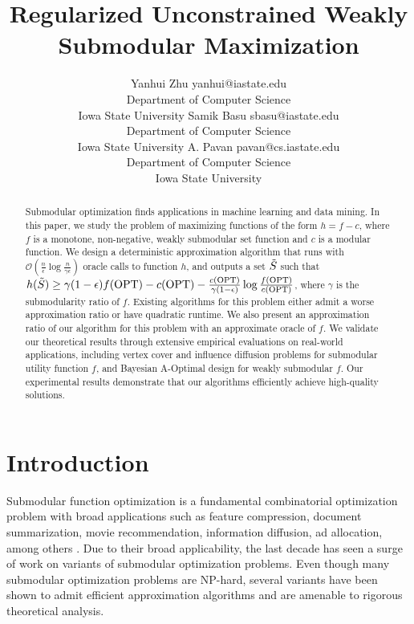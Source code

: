 \documentclass[10pt]{article} %
\title{Regularized Unconstrained Weakly Submodular Maximization}
\author{\name Yanhui Zhu \email yanhui@iastate.edu \\
      \addr Department of Computer Science\\
      Iowa State University
      \AND
      \name Samik Basu \email sbasu@iastate.edu \\
      \addr Department of Computer Science\\
      Iowa State University
      \AND
      \name A. Pavan \email pavan@cs.iastate.edu\\
      \addr Department of Computer Science\\
      Iowa State University}
\theoremstyle{remark}
\newcommand{\OPT}{{\rm OPT}}
\begin{document}
\maketitle

\begin{abstract}
Submodular optimization finds applications in machine learning and data mining. In this paper, we study the problem of maximizing functions of the form $h = f-c$,  where $f$ is a monotone, non-negative, weakly submodular set function and $c$ is a modular function. We design a deterministic approximation algorithm that runs with ${\mathcal{O}}(\frac{n}{\epsilon}\log \frac{n}{\gamma \epsilon})$ oracle calls to function $h$, and outputs a set $\Tilde{S}$ such that $h(\Tilde{S}) \geq \gamma(1-\epsilon)f(\OPT)-c(\OPT)-\frac{c(\OPT)}{\gamma(1-\epsilon)}\log\frac{f(\OPT)}{c(\OPT)}$, where $\gamma$ is the submodularity ratio of $f$. Existing algorithms for this problem either admit a worse approximation ratio or have quadratic runtime. We also present an approximation ratio of our algorithm for this problem with an approximate oracle of $f$. We validate our theoretical results through extensive empirical evaluations on real-world applications, including vertex cover and influence diffusion problems for submodular utility function $f$, and Bayesian A-Optimal design for weakly submodular $f$. Our experimental results demonstrate that our algorithms efficiently achieve high-quality solutions.
\end{abstract}


\section{Introduction}
\label{sec:intro}
Submodular function optimization is a fundamental combinatorial optimization problem with broad applications such as feature compression, document summarization, movie recommendation,  information diffusion, ad allocation, among others \cite{bateni2019categorical,sipos2012temporal,el2022data,li2023submodularity,kempe2003maximizing,tang2016optimizing}. Due to their broad applicability, the last decade has seen a surge of work on variants of submodular optimization problems. 
Even though many submodular optimization problems are NP-hard, several variants have been shown to admit efficient approximation algorithms and are amenable to rigorous theoretical analysis. 
\end{document}
